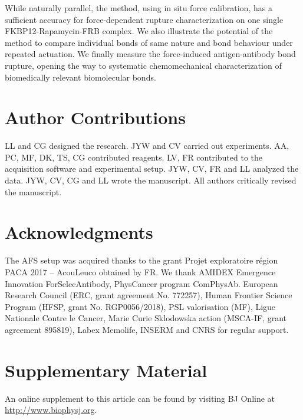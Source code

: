 \documentclass{biophys-new}
\begin{document}
While naturally parallel, the method, using in situ force calibration, has a sufficient accuracy for force-dependent rupture characterization on one single FKBP12-Rapamycin-FRB complex. We also illustrate the potential of the method to compare individual bonds of same nature and bond behaviour under repeated actuation. We finally measure the force-induced antigen-antibody bond rupture, opening the way to systematic chemomechanical characterization of biomedically relevant biomolecular bonds.

\section*{Author Contributions}

LL and CG designed the research. JYW and CV carried out experiments. AA, PC, MF, DK, TS, CG contributed reagents. LV, FR contributed to the acquisition software and experimental setup. JYW, CV, FR and LL analyzed the data. JYW, CV, CG and LL wrote the manuscript. All authors critically revised the manuscript.

\section*{Acknowledgments}

The AFS setup was acquired thanks to the grant Projet exploratoire région PACA 2017 – AcouLeuco obtained by FR. We thank AMIDEX Emergence Innovation ForSelecAntibody, PhysCancer program ComPhysAb. European Research Council (ERC, grant agreement No. 772257), Human Frontier Science Program (HFSP, grant No. RGP0056/2018), PSL valorisation (MF), Ligue Nationale Contre le Cancer,  Marie Curie Sklodowska action (MSCA-IF, grant agreement 895819), Labex Memolife, INSERM and CNRS for regular support.





\newpage

\FloatBarrier

\newpage

\section*{Supplementary Material}

An online supplement to this article can be found by visiting BJ Online at \url{http://www.biophysj.org}.
\end{document}
